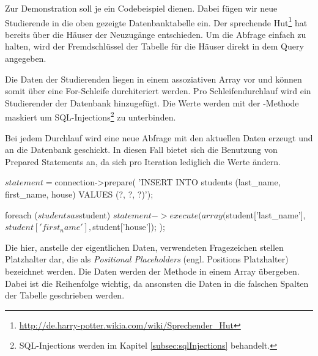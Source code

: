 Zur Demonstration soll je ein Codebeispiel dienen. Dabei fügen wir neue Studierende in die oben gezeigte Datenbanktabelle ein. Der sprechende Hut\footnote{\url{http://de.harry-potter.wikia.com/wiki/Sprechender_Hut}} hat bereits über die Häuser der Neuzugänge entschieden. Um die Abfrage einfach zu halten, wird der Fremdschlüssel der Tabelle für die Häuser direkt in dem Query angegeben.

Die Daten der Studierenden liegen in einem assoziativen Array vor und können somit über eine For-Schleife durchiteriert werden. Pro Schleifendurchlauf wird ein Studierender der Datenbank hinzugefügt. Die Werte werden mit der -Methode maskiert um SQL-Injections\footnote{SQL-Injections werden im Kapitel \ref{subsec:sqlInjections} behandelt.\label{ftn:maskQueries}} zu unterbinden.


Bei jedem Durchlauf wird eine neue Abfrage mit den aktuellen Daten erzeugt und an die Datenbank geschickt. In diesen Fall bietet sich die Benutzung von Prepared Statements an, da sich pro Iteration lediglich die Werte ändern.

\begin{phpcode}
$statement = $connection->prepare(
  'INSERT INTO students (last_name, first_name, house)
    VALUES (?, ?, ?)');

foreach ($students as $student) {
	$statement->execute(
	  array(
	    $student['last_name'],
	    $student['first_name'],
	    $student['house']);
	);
}
\end{phpcode}

Die hier, anstelle der eigentlichen Daten, verwendeten Fragezeichen stellen Platzhalter dar, die als \textit{Positional Placeholders} (engl. Positions Platzhalter) bezeichnet werden. Die Daten werden der Methode  in einem Array übergeben. Dabei ist die Reihenfolge wichtig, da ansonsten die Daten in die falschen Spalten der Tabelle geschrieben werden.

